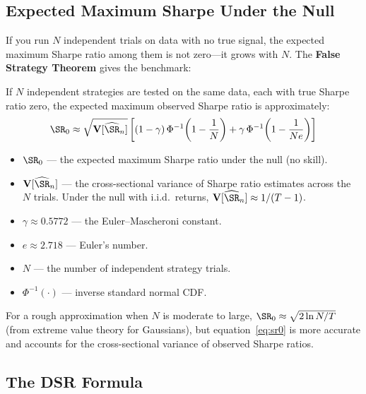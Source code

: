 \subsection{Expected Maximum Sharpe Under the Null}

If you run $N$ independent trials on data with no true signal, the expected maximum Sharpe ratio among them is not zero---it grows with $N$. The \textbf{False Strategy Theorem} gives the benchmark:

\begin{definition}
If $N$ independent strategies are tested on the same data, each with true Sharpe ratio zero, the expected maximum observed Sharpe ratio is approximately:
\begin{equation}
\SR_0 \approx \sqrt{\mathbf{V}[\widehat{\SR}_n]} \left[ (1 - \gamma)\,\Phi^{-1}\!\left(1 - \frac{1}{N}\right) + \gamma\,\Phi^{-1}\!\left(1 - \frac{1}{N e}\right) \right]
\label{eq:sr0}
\end{equation}
\begin{itemize}[nosep]
  \item $\SR_0$ --- the expected maximum Sharpe ratio under the null (no skill).
  \item $\mathbf{V}[\widehat{\SR}_n]$ --- the cross-sectional variance of Sharpe ratio estimates across the $N$ trials. Under the null with i.i.d.\ returns, $\mathbf{V}[\widehat{\SR}_n] \approx 1/(T-1)$.
  \item $\gamma \approx 0.5772$ --- the Euler--Mascheroni constant.
  \item $e \approx 2.718$ --- Euler's number.
  \item $N$ --- the number of independent strategy trials.
  \item $\Phi^{-1}(\cdot)$ --- inverse standard normal CDF.
\end{itemize}
\end{definition}

For a rough approximation when $N$ is moderate to large, $\SR_0 \approx \sqrt{2 \ln N / T}$ (from extreme value theory for Gaussians), but equation~\eqref{eq:sr0} is more accurate and accounts for the cross-sectional variance of observed Sharpe ratios.

\subsection{The DSR Formula}

